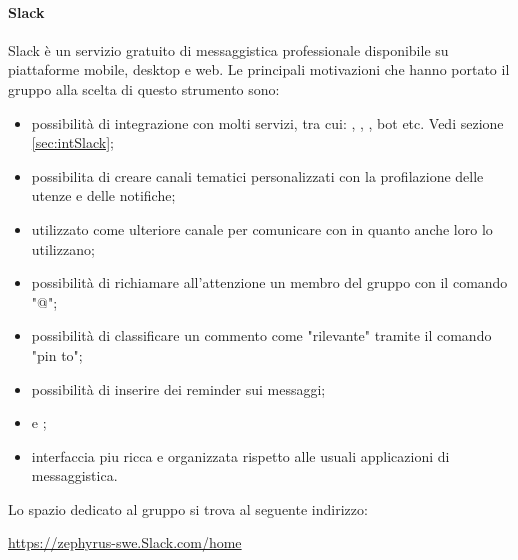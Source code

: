 		\paragraph{Slack}
		\label{sec:Slack}
		Slack è un servizio gratuito  di messaggistica professionale disponibile su piattaforme mobile, desktop e web. Le principali motivazioni che hanno portato il gruppo alla scelta di questo strumento sono:
		\begin{itemize}
			\item possibilità di integrazione con molti servizi, tra cui: , , , bot etc. Vedi sezione \ref{sec:intSlack};
			\item possibilita di creare canali tematici personalizzati con la profilazione delle utenze e delle notifiche;
			\item utilizzato come ulteriore canale per comunicare con \riskapp{} in quanto anche loro lo utilizzano;
			\item possibilità di richiamare all'attenzione un membro del gruppo con il comando "@";
			\item possibilità di classificare  un commento  come "rilevante" tramite il comando "pin to";
			\item possibilità di inserire dei reminder sui messaggi;
			\item {} e ;
			\item interfaccia piu ricca e organizzata rispetto alle usuali applicazioni di messaggistica.
		\end{itemize}
		Lo spazio dedicato al gruppo si trova al seguente indirizzo:
		\begin{center}
			\url{https://zephyrus-swe.Slack.com/home}
		\end{center}
